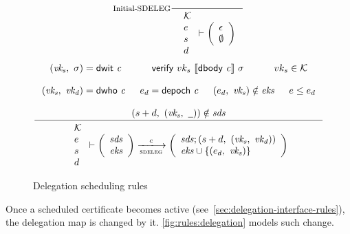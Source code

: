 \begin{figure}[htb]
  \begin{equation}
    \inference[Initial-SDELEG]
    {
    }
    {
      {\begin{array}{l}
       \mathcal{K}\\
        e\\
        s\\
        d
      \end{array}}
      \vdash
      \left(
        \begin{array}{l}
          \epsilon\\
          \emptyset
        \end{array}
      \right)
    }
  \end{equation}
  \nextdef
  \begin{equation}
    \label{eq:rule:delegation-scheduling}
    \inference
    {
      (\var{vk_s},~ \sigma) = \dwit{c}
      & \verify{vk_s}{\serialised{\dbody{c}}}{\sigma} & vk_s \in \mathcal{K}\\ ~ \\
      (\var{vk_s},~ \var{vk_d}) = \dwho{c} & e_d = \depoch{c}
      & (e_d,~ \var{vk_s}) \notin \var{eks} & e \leq e_d \\ ~ \\
      (s + d,~ (\var{vk_s},~ \wcard)) \notin \var{sds}\\
    }
    {
      {\begin{array}{l}
       \mathcal{K}\\
        e\\
        s\\
        d
      \end{array}}
      \vdash
      {
        \left(
          \begin{array}{l}
            \var{sds}\\
            \var{eks}
          \end{array}
        \right)
      }
      \trans{sdeleg}{c}
      {
        \left(
          \begin{array}{l}
            \var{sds}; (s + d,~ (\var{vk_s},~ \var{vk_d}))\\
            \var{eks} \cup \{(e_d,~ \var{vk_s})\}
          \end{array}
        \right)
      }
    }
  \end{equation}
  \caption{Delegation scheduling rules}
  \label{fig:rules:delegation-scheduling}
\end{figure}

Once a scheduled certificate becomes active
(see~\cref{sec:delegation-interface-rules}), the delegation map is changed by
it. \cref{fig:rules:delegation} models such change.

